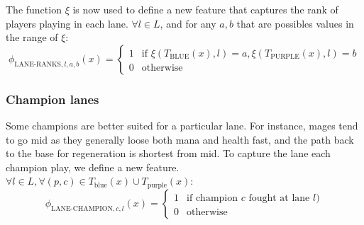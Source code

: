 The function $\xi$ is now used to define a new feature that captures the rank of players playing in each lane.
$\forall l \in L$, and for any $a,b$ that are possibles values in the range of $\xi$:
\begin{equation}\label{eq:laneranks}
\phi_{\text{LANE-RANKS},l,a,b}(x) =
\begin{cases} 
  1 & \text{if } \xi(T_\text{BLUE}(x),l) = a, \xi(T_\text{PURPLE}(x),l) = b\\
  0 & \text{otherwise} 
\end{cases}  
\end{equation}


\subsubsection{Champion lanes}
Some champions are better suited for a particular lane. For instance, mages tend to go mid as they generally loose both mana and health fast, and the path back to the base for regeneration is shortest from mid. To capture the lane each champion play, we define a new feature.
$\forall l \in L, \forall(p, c) \in T_\text{blue}(x) \cup T_\text{purple}(x)$:
\begin{equation}\label{eq:championlane}
  \phi_{\text{LANE-CHAMPION},c,l}(x) =
\begin{cases} 
  1 & \text{if champion } c \text{ fought at lane } l)\\
  0 & \text{otherwise} 
\end{cases}
\end{equation}

